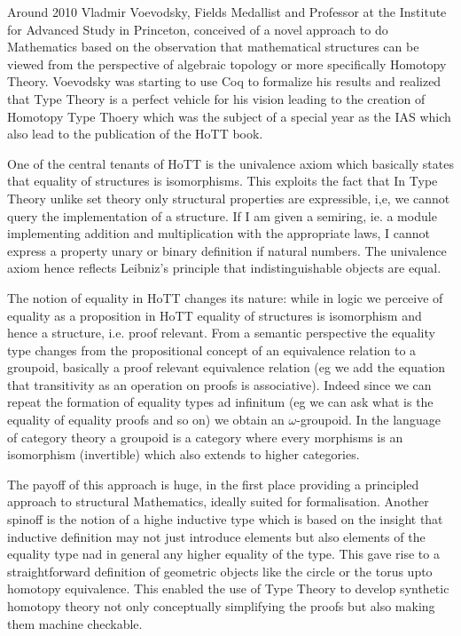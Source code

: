 \documentclass[a4paper,11pt]{article}
\begin{document}
Around 2010 Vladmir Voevodsky, Fields Medallist and Professor at the
Institute for Advanced Study in Princeton, conceived of a novel
approach to do Mathematics based on the observation that mathematical
structures can be viewed from the perspective of algebraic topology or
more specifically Homotopy Theory. Voevodsky was starting to use Coq
to formalize his results and realized that Type Theory is a perfect
vehicle for his vision leading to the creation of Homotopy Type Thoery
which was the subject of a special year as the IAS which also lead to
the publication of the HoTT book.

One of the central tenants of HoTT is the univalence axiom which
basically states that equality of structures is isomorphisms. This
exploits the fact that In Type Theory unlike set theory only
structural properties are expressible, i,e, we cannot query the
implementation of a structure. If I am given a semiring, ie. a module
implementing addition
and multiplication with the appropriate laws, I cannot express a
property unary or binary definition if natural numbers. The univalence
axiom hence reflects Leibniz's principle that indistinguishable objects
are equal.

The notion of equality in HoTT changes its nature: while in logic we
perceive of equality as a proposition in HoTT equality of structures
is isomorphism and hence a structure, i.e. proof relevant. From a
semantic perspective the equality type changes from the propositional
concept of an equivalence relation to a groupoid, basically a
proof relevant equivalence relation (eg we add the equation that
transitivity as an operation on proofs is associative). Indeed since
we can repeat the formation of equality types ad infinitum (eg we can
ask what is the equality of equality proofs and so on) we obtain an
$\omega$-groupoid. In the language of category theory a groupoid is a
category where every morphisms is an isomorphism (invertible) which
also extends to higher categories. 

The payoff of this approach is huge, in the first place providing a
principled approach to structural Mathematics, ideally suited for
formalisation. Another spinoff is the notion of a highe inductive
type which is based on the insight that inductive definition may not
just introduce elements but also elements of the equality type nad in
general any higher equality of the type. This gave rise to a
straightforward definition of geometric objects like the circle or the
torus upto homotopy equivalence. This enabled the use of Type Theory to
develop synthetic homotopy theory not only conceptually simplifying
the proofs but also making them machine checkable.
\end{document}
